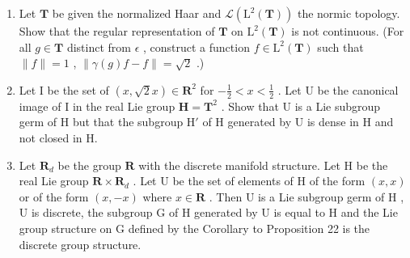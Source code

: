 \begin{enumerate}
\def\labelenumi{\arabic{enumi}.}
\setcounter{enumi}{7}
\item
  Let \(\mathbf{T}\) be given the normalized Haar and \(\mathcal{L}(\mathrm{L}^2 (\mathbf{T}))\) the normic topology. Show that the regular representation of \(\mathbf{T}\) on \(\mathrm{L}^2 (\mathbf{T})\) is not continuous. (For all \(g\in \mathbf{T}\) distinct from \(\epsilon\) , construct a function \(f\in \mathrm{L}^2 (\mathbf{T})\) such that \(\| f\| = 1\) , \(\| \gamma (g)f - f\| = \sqrt{2}\) .)
\item
  Let I be the set of \((x, \sqrt{2} x) \in \mathbf{R}^2\) for \(-\frac{1}{2} < x < \frac{1}{2}\) . Let U be the canonical image of I in the real Lie group \(\mathbf{H} = \mathbf{T}^2\) . Show that U is a Lie subgroup germ of H but that the subgroup \(\mathrm{H}'\) of H generated by U is dense in H and not closed in H.
\item
  Let \(\mathbf{R}_d\) be the group \(\mathbf{R}\) with the discrete manifold structure. Let \(\mathrm{H}\) be the real Lie group \(\mathbf{R} \times \mathbf{R}_d\) . Let \(\mathrm{U}\) be the set of elements of \(\mathrm{H}\) of the form \((x, x)\) or of the form \((x, -x)\) where \(x \in \mathbf{R}\) . Then \(\mathrm{U}\) is a Lie subgroup germ of \(\mathrm{H}\) , \(\mathrm{U}\) is discrete, the subgroup \(\mathrm{G}\) of \(\mathrm{H}\) generated by \(\mathrm{U}\) is equal to \(\mathrm{H}\) and the Lie group structure on \(\mathrm{G}\) defined by the Corollary to Proposition 22 is the discrete group structure.
\end{enumerate}

